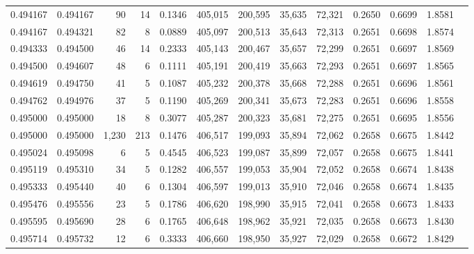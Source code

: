\begin{tabular}{rrrrrrrrrrrrr}
0.494167 & 0.494167 &    90 &  14 &                                     0.1346 & 405,015 & 200,595 &  35,635 &  72,321 & 0.2650 & 0.6699 & 1.8581 \\
0.494167 & 0.494321 &    82 &   8 &                                     0.0889 & 405,097 & 200,513 &  35,643 &  72,313 & 0.2651 & 0.6698 & 1.8574 \\
0.494333 & 0.494500 &    46 &  14 &                                     0.2333 & 405,143 & 200,467 &  35,657 &  72,299 & 0.2651 & 0.6697 & 1.8569 \\
0.494500 & 0.494607 &    48 &   6 &                                     0.1111 & 405,191 & 200,419 &  35,663 &  72,293 & 0.2651 & 0.6697 & 1.8565 \\
0.494619 & 0.494750 &    41 &   5 &                                     0.1087 & 405,232 & 200,378 &  35,668 &  72,288 & 0.2651 & 0.6696 & 1.8561 \\
0.494762 & 0.494976 &    37 &   5 &                                     0.1190 & 405,269 & 200,341 &  35,673 &  72,283 & 0.2651 & 0.6696 & 1.8558 \\
0.495000 & 0.495000 &    18 &   8 &                                     0.3077 & 405,287 & 200,323 &  35,681 &  72,275 & 0.2651 & 0.6695 & 1.8556 \\
0.495000 & 0.495000 & 1,230 & 213 &                                     0.1476 & 406,517 & 199,093 &  35,894 &  72,062 & 0.2658 & 0.6675 & 1.8442 \\
0.495024 & 0.495098 &     6 &   5 &                                     0.4545 & 406,523 & 199,087 &  35,899 &  72,057 & 0.2658 & 0.6675 & 1.8441 \\
0.495119 & 0.495310 &    34 &   5 &                                     0.1282 & 406,557 & 199,053 &  35,904 &  72,052 & 0.2658 & 0.6674 & 1.8438 \\
0.495333 & 0.495440 &    40 &   6 &                                     0.1304 & 406,597 & 199,013 &  35,910 &  72,046 & 0.2658 & 0.6674 & 1.8435 \\
0.495476 & 0.495556 &    23 &   5 &                                     0.1786 & 406,620 & 198,990 &  35,915 &  72,041 & 0.2658 & 0.6673 & 1.8433 \\
0.495595 & 0.495690 &    28 &   6 &                                     0.1765 & 406,648 & 198,962 &  35,921 &  72,035 & 0.2658 & 0.6673 & 1.8430 \\
0.495714 & 0.495732 &    12 &   6 &                                     0.3333 & 406,660 & 198,950 &  35,927 &  72,029 & 0.2658 & 0.6672 & 1.8429 \\

\end{tabular}
